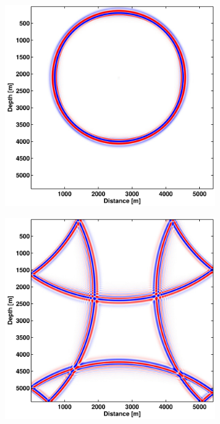\begin{figure}[ht!]
\begin{subfigure}[b]{0.45\textwidth}
        \caption{}
    \end{subfigure}
    \vfill
    \begin{subfigure}[b]{0.45\textwidth}
        \centering
        \includegraphics[width=\textwidth]{figures/homogenous_grid_n_4_5.pdf}
        \caption{}
    \end{subfigure}
    \hfill
    \begin{subfigure}[b]{0.45\textwidth}
        \centering
        \includegraphics[width=\textwidth]{figures/homogenous_grid_n_4_10.pdf}

\end{subfigure}
\end{figure}
